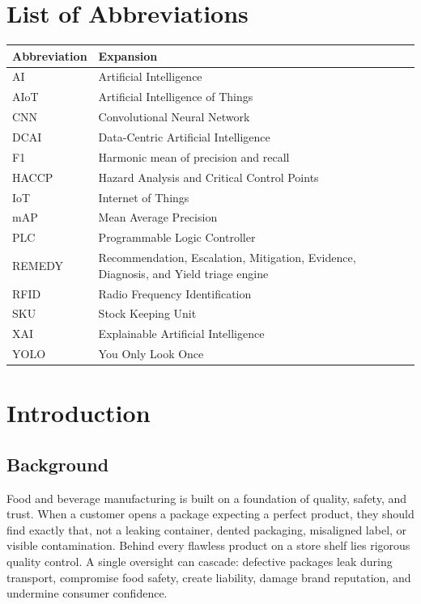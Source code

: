 \documentclass[12pt,a4paper]{report}
\begin{document}
\chapter*{\centering List of Abbreviations}
\begin{tabularx}{\textwidth}{|P{3cm}|Y|}
  \hline
  \textbf{Abbreviation} & \textbf{Expansion} \\
  \hline
  AI & Artificial Intelligence \\
  \hline
  AIoT & Artificial Intelligence of Things \\
  \hline
  CNN & Convolutional Neural Network \\
  \hline
  DCAI & Data-Centric Artificial Intelligence \\
  \hline
  F1 & Harmonic mean of precision and recall \\
  \hline
  HACCP & Hazard Analysis and Critical Control Points \\
  \hline
  IoT & Internet of Things \\
  \hline
  mAP & Mean Average Precision \\
  \hline
  PLC & Programmable Logic Controller \\
  \hline
  REMEDY & Recommendation, Escalation, Mitigation, Evidence, Diagnosis, and Yield triage engine \\
  \hline
  RFID & Radio Frequency Identification \\
  \hline
  SKU & Stock Keeping Unit \\
  \hline
  XAI & Explainable Artificial Intelligence \\
  \hline
  YOLO & You Only Look Once \\
  \hline
\end{tabularx}

\newpage
{}
\setcounter{page}{1}
\pagestyle{chapterstyle}

\chapter{Introduction}

\section{Background}
\label{sec:background}

Food and beverage manufacturing is built on a foundation of quality, safety, and trust. When a customer opens a package expecting a perfect product, they should find exactly that, not a leaking container, dented packaging, misaligned label, or visible contamination. Behind every flawless product on a store shelf lies rigorous quality control. A single oversight can cascade: defective packages leak during transport, compromise food safety, create liability, damage brand reputation, and undermine consumer confidence.
\end{document}
